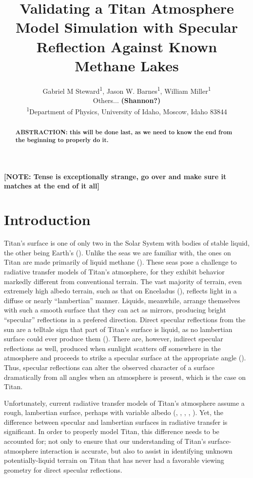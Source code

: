 \documentclass{article}
\title{\textbf{Validating a Titan Atmosphere Model Simulation with Specular Reflection Against Known Methane Lakes}}
\author{Gabriel M Steward\textsuperscript{1}, Jason W. Barnes\textsuperscript{1}, William Miller\textsuperscript{1} \\Others... \textbf{\color{red}(Shannon?)\color{black}}\\
		{\scriptsize \textsuperscript{1}Department of Physics, University of Idaho, Moscow, Idaho 83844}
}
\begin{document}
\pagestyle{fancy}
\fancyhead{}
\maketitle

\begin{abstract}
\textbf{\color{red}ABSTRACTION: this will be done last, as we need to know the end from the beginning to properly do it.\color{black}}
\end{abstract}

\textbf{\color{red} [NOTE: Tense is exceptionally strange, go over and make sure it matches at the end of it all] \color{black}}
 

\section{Introduction}
Titan's surface is one of only two in the Solar System with bodies of stable liquid, the other being Earth's (\cite{Hayes2016}). Unlike the seas we are familiar with, the ones on Titan are made primarily of liquid methane (\cite{Mastrogiuseppe2016}). These seas pose a challenge to radiative transfer models of Titan's atmosphere, for they exhibit behavior markedly different from conventional terrain. The vast majority of terrain, even extremely high albedo terrain, such as that on Enceladus (\cite{Li2023}), reflects light in a diffuse or nearly ``lambertian'' manner. Liquids, meanwhile, arrange themselves with such a smooth surface that they can act as mirrors, producing bright ``specular'' reflections in a prefered direction. Direct specular reflections from the sun are a telltale sign that part of Titan's surface is liquid, as no lambertian surface could ever produce them (\cite{Stephan2010}). There are, however, indirect specular reflections as well, produced when sunlight scatters off somewhere in the atmosphere and proceeds to strike a specular surface at the appropriate angle (\cite{Vixie2015}). Thus, specular reflections can alter the observed character of a surface dramatically from all angles when an atmosphere is present, which is the case on Titan.

Unfortunately, current radiative transfer models of Titan's atmosphere assume a rough, lambertian surface, perhaps with variable albedo (\cite{Griffith2012}, \cite{Xu2013}, \cite{Corlies2021}, \cite{Rannou2021}, \cite{EsSayeh2023}). Yet, the difference between specular and lambertian surfaces in radiative transfer is significant. In order to properly model Titan, this difference needs to be accounted for; not only to ensure that our understanding of Titan's surface-atmosphere interaction is accurate, but also to assist in identifying unknown potentially-liquid terrain on Titan that has never had a favorable viewing geometry for direct specular reflections. 
\end{document}
